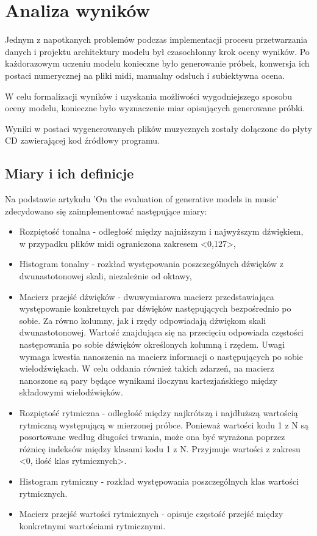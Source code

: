 \chapter{Analiza wyników}
{

    Jednym z\,\,napotkanych problemów podczas implementacji procesu przetwarzania danych i\,\,projektu architektury modelu
    był czasochłonny krok oceny wyników. Po każdorazowym uczeniu modelu konieczne było generowanie próbek, 
    konwersja ich postaci numerycznej na pliki midi, manualny odsłuch i\,\,subiektywna ocena.

    W\,\,celu formalizacji wyników i\,\,uzyskania możliwości wygodniejszego sposobu oceny modelu, konieczne było wyznaczenie
    miar opisujących generowane próbki. 

    Wyniki w postaci wygenerowanych plików muzycznych zostały dołączone do płyty CD zawierającej kod źródłowy programu.

    \section{Miary i\,\,ich definicje}
    {
        Na podstawie artykułu 'On the evaluation of generative models in music'\cite{Yang2018OnTE} zdecydowano się zaimplementować następujące miary:
        \begin{itemize}
            \setlength\itemsep{-0.5em}
            \item Rozpiętość tonalna - odległość między najniższym i\,\,najwyższym dźwiękiem, w\,\,przypadku plików midi ograniczona
            zakresem <0,127>,
            \item Histogram tonalny - rozkład występowania poszczególnych dźwięków z\,\,dwunastotonowej skali, niezależnie od oktawy, 
            \item Macierz przejść dźwięków - dwuwymiarowa macierz przedstawiająca występowanie konkretnych par dźwięków następujących
            bezpośrednio po sobie. Za równo kolumny, jak i rzędy odpowiadają dźwiękom skali dwunastotonowej. 
            Wartość znajdująca się na przecięciu odpowiada częstości następowania po sobie dźwięków określonych kolumną i rzędem. 
            Uwagi wymaga kwestia nanoszenia na macierz informacji o\,\,następujących po sobie wielodźwiękach. W\,\,celu oddania
            również takich zdarzeń, na macierz nanoszone są pary będące wynikami iloczynu kartezjańskiego między składowymi wielodźwięków.
            \item Rozpiętość rytmiczna - odległość między najkrótszą i\,\,najdłuższą wartością rytmiczną występującą w\,\,mierzonej próbce. 
            Ponieważ wartości kodu 1 z\,\,N są posortowane według długości trwania, może ona być wyrażona poprzez różnicę indeksów 
            między klasami kodu 1 z\,\,N. Przyjmuje wartości z\,\,zakresu <0, ilość klas rytmicznych>.
            \item Histogram rytmiczny - rozkład występowania poszczególnych klas wartości rytmicznych.
            \item Macierz przejść wartości rytmicznych - opisuje częstość przejść między konkretnymi wartościami rytmicznymi.
        \end{itemize}

}}
